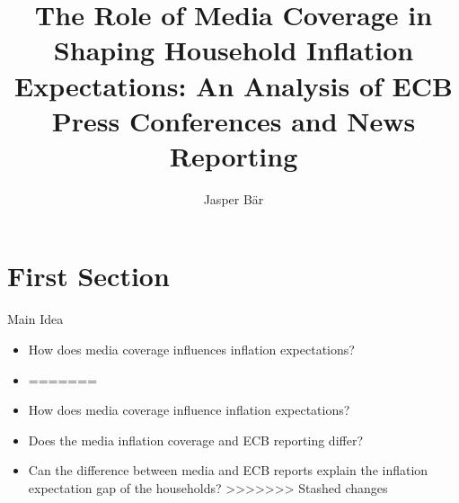 \documentclass[aspectratio=169,xcolor=dvipsnames]{beamer}
\title{The Role of Media Coverage in Shaping Household Inflation Expectations: An Analysis of ECB Press Conferences and News Reporting}
\author[authors] {Jasper Bär}
\begin{document}
\begin{frame}
    \titlepage
\end{frame}

\section{First Section}

\begin{frame}{Main Idea}

\begin{itemize}
<<<<<<< Updated upstream
	\item How does media coverage influences inflation expectations?
	\item 
=======
\item How does media coverage influence inflation expectations?
\item Does the media inflation coverage and ECB reporting differ?
\item Can the difference between media and ECB reports explain the inflation expectation gap of the households?
>>>>>>> Stashed changes
\end{itemize}

\end{frame}

\end{document}
